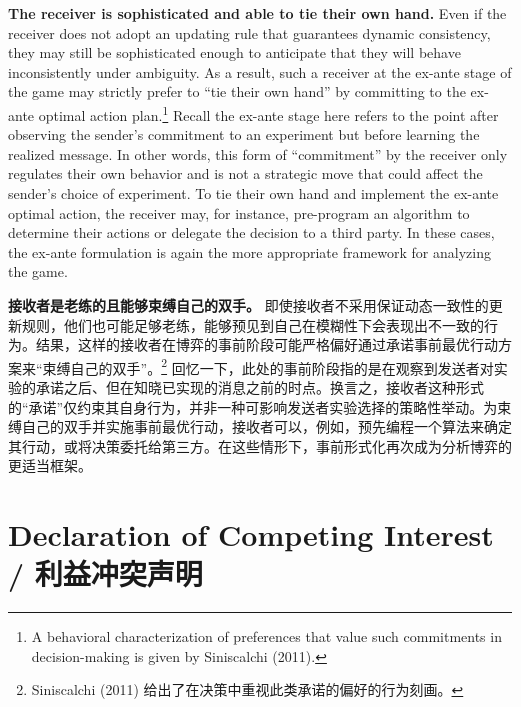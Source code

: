 \documentclass[12pt,a4paper]{article}
\theoremstyle{definition}
\theoremstyle{remark}
\newenvironment{original}{%
    \par\medskip\noindent%
    \begin{tcolorbox}[%
        colback=white,%
        colframe=black!50,%
        title=\textbf{Original English},%
        fonttitle=\small\bfseries,%
        left=0pt, right=0pt, top=2pt, bottom=2pt,%
        boxrule=0.5pt,%
        arc=0pt,%
        outer arc=0pt%
    ]%
    \small%
}{%
    \end{tcolorbox}%
}
\newenvironment{translation}{%
    \par\smallskip\noindent%
    \begin{tcolorbox}[%
        colback=blue!3!white,%
        colframe=blue!40!black,%
        title=\textbf{中文翻译},%
        fonttitle=\small\bfseries,%
        left=0pt, right=0pt, top=2pt, bottom=2pt,%
        boxrule=0.5pt,%
        arc=0pt,%
        outer arc=0pt%
    ]%
    \small\color{blue!60!black}%
}{%
    \end{tcolorbox}\medskip%
}
\begin{document}
\begin{original}
\textbf{The receiver is sophisticated and able to tie their own hand.} Even if the receiver does not adopt an updating rule that guarantees dynamic consistency, they may still be sophisticated enough to anticipate that they will behave inconsistently under ambiguity. As a result, such a receiver at the ex-ante stage of the game may strictly prefer to ``tie their own hand'' by committing to the ex-ante optimal action plan.\footnote{A behavioral characterization of preferences that value such commitments in decision-making is given by Siniscalchi (2011).} Recall the ex-ante stage here refers to the point after observing the sender's commitment to an experiment but before learning the realized message. In other words, this form of ``commitment'' by the receiver only regulates their own behavior and is not a strategic move that could affect the sender's choice of experiment. To tie their own hand and implement the ex-ante optimal action, the receiver may, for instance, pre-program an algorithm to determine their actions or delegate the decision to a third party. In these cases, the ex-ante formulation is again the more appropriate framework for analyzing the game.
\end{original}
\begin{translation}
\textbf{接收者是老练的且能够束缚自己的双手。} 即使接收者不采用保证动态一致性的更新规则，他们也可能足够老练，能够预见到自己在模糊性下会表现出不一致的行为。结果，这样的接收者在博弈的事前阶段可能严格偏好通过承诺事前最优行动方案来``束缚自己的双手''。\footnote{Siniscalchi (2011) 给出了在决策中重视此类承诺的偏好的行为刻画。} 回忆一下，此处的事前阶段指的是在观察到发送者对实验的承诺之后、但在知晓已实现的消息之前的时点。换言之，接收者这种形式的``承诺''仅约束其自身行为，并非一种可影响发送者实验选择的策略性举动。为束缚自己的双手并实施事前最优行动，接收者可以，例如，预先编程一个算法来确定其行动，或将决策委托给第三方。在这些情形下，事前形式化再次成为分析博弈的更适当框架。
\end{translation}

\section*{Declaration of Competing Interest / 利益冲突声明}
\end{document}
